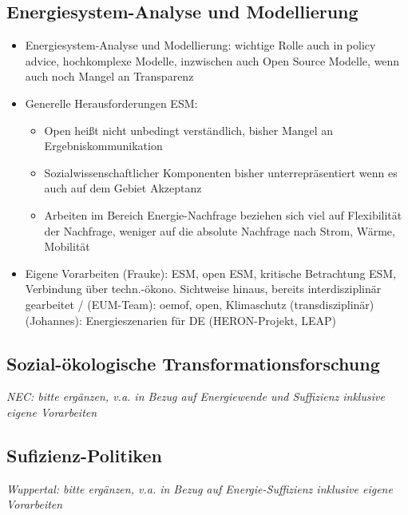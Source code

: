 \documentclass[a4paper,11pt,twoside]{scrartcl}
\begin{document}
\subsection*{Energiesystem-Analyse und Modellierung}
\begin{itemize}
    \item Energiesystem-Analyse und Modellierung: wichtige Rolle auch in policy advice, hochkomplexe Modelle, inzwischen auch Open Source Modelle, wenn auch noch Mangel an Transparenz
    \item Generelle Herausforderungen ESM:
    \begin{itemize}
     \item Open heißt nicht unbedingt verständlich, bisher Mangel an Ergebniskommunikation 
     \item Sozialwissenschaftlicher Komponenten bisher unterrepräsentiert wenn es auch auf dem Gebiet Akzeptanz
     \item Arbeiten im Bereich Energie-Nachfrage beziehen sich viel auf Flexibilität der Nachfrage, weniger auf die absolute Nachfrage nach Strom, Wärme, Mobilität
    \end{itemize}
    \item Eigene Vorarbeiten (Frauke): ESM, open ESM, kritische Betrachtung ESM, Verbindung über techn.-ökono. Sichtweise hinaus, bereits interdisziplinär gearbeitet / (EUM-Team): oemof, open, Klimaschutz (transdisziplinär)
    (Johannes): Energieszenarien für DE (HERON-Projekt, LEAP)
\end{itemize}

\subsection*{Sozial-ökologische Transformationsforschung}
\textit{NEC: bitte ergänzen, v.a. in Bezug auf Energiewende und Suffizienz inklusive eigene Vorarbeiten}
    
\subsection*{Sufizienz-Politiken}
\textit{Wuppertal: bitte ergänzen, v.a. in Bezug auf Energie-Suffizienz inklusive eigene Vorarbeiten}
\end{document}
